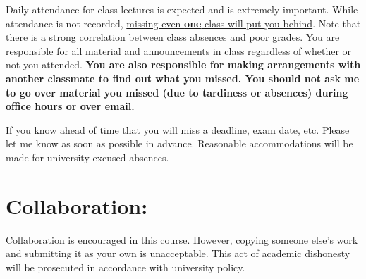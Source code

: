 \documentclass[margin]{res}
\theoremstyle{plain}
\theoremstyle{definition}
\theoremstyle{remark}
\begin{document}
\begin{resume}
Daily attendance for class lectures is expected and is extremely important. 
While attendance is not recorded, \underline{missing even \textbf{one} class will put you behind}. Note that there is a strong correlation between class absences and poor grades.   You are responsible for all material and announcements in class regardless of whether or not you attended.  \textbf{You are also responsible for making arrangements with another classmate to find out what you missed.  You should not ask me to go over material you missed (due to tardiness or absences) during office hours or over email.} 

If you know ahead of time that you will miss a deadline, exam date, etc. Please let me know as soon as possible in advance. Reasonable accommodations will be made for university-excused absences.


% 

\section{Collaboration:} Collaboration is encouraged in this course. However, copying someone else's work and submitting it as your own is unacceptable.  This act of academic dishonesty will be prosecuted in accordance with university policy.


\end{resume}
\end{document}
